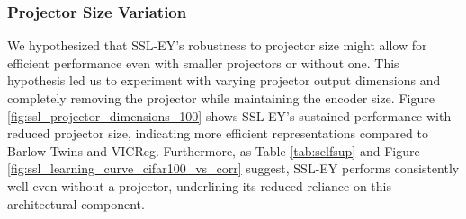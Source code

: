 \subsubsection{Projector Size Variation} We hypothesized that SSL-EY's robustness to projector size might allow for efficient performance even with smaller projectors or without one.
This hypothesis led us to experiment with varying projector output dimensions and completely removing the projector while maintaining the encoder size.
Figure \ref{fig:ssl_projector_dimensions_100} shows SSL-EY's sustained performance with reduced projector size, indicating more efficient representations compared to Barlow Twins and VICReg.
Furthermore, as Table \ref{tab:selfsup} and Figure \ref{fig:ssl_learning_curve_cifar100_vs_corr} suggest, SSL-EY performs consistently well even without a projector, underlining its reduced reliance on this architectural component.

